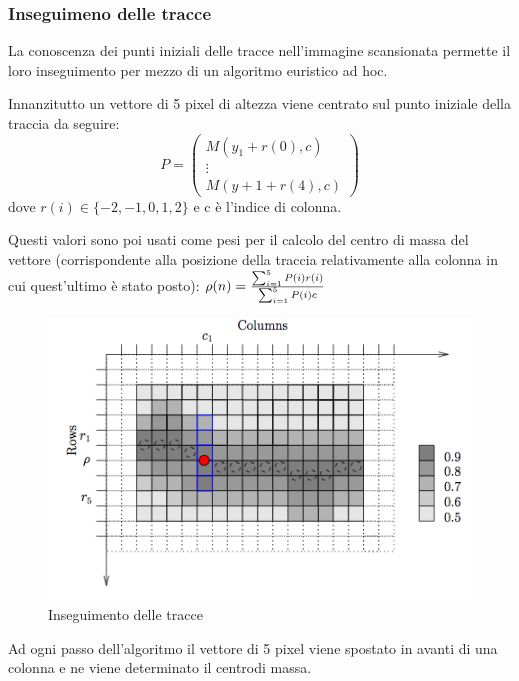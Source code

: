 \subsubsection{Inseguimeno delle tracce}
La conoscenza dei punti iniziali delle tracce nell'immagine scansionata permette il loro inseguimento per mezzo di un algoritmo euristico ad hoc.

Innanzitutto un vettore di 5 pixel di altezza viene centrato sul punto iniziale della traccia da seguire:
$$
P = 
\begin{pmatrix}
M(y_1+r(0), c)\\
\vdots \\
M(y+1+r(4), c)
\end{pmatrix}
$$
dove $r(i) \in \{-2,-1,0,1,2\}$ e c \`e l'indice di colonna.

Questi valori sono poi usati come pesi per il calcolo del centro di massa del vettore (corrispondente alla posizione della traccia relativamente alla colonna in cui quest'ultimo \`e stato posto): $\rho(n) = {\sum_{i=1}^{5}{P(i)r(i)}\over{\sum_{i=1}^{5}{P(i)c}}}$
\begin{figure}[h!t]
\begin{center}
\includegraphics[scale=0.5]{./img/track-following.png}
\caption{Inseguimento delle tracce}
\end{center}
\end{figure}
Ad ogni passo dell'algoritmo il vettore di 5 pixel viene spostato in avanti di una colonna e ne viene determinato il centrodi massa.
